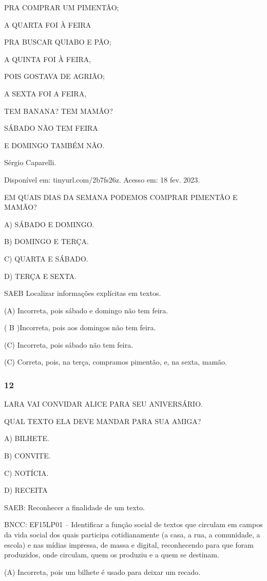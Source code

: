 PRA COMPRAR UM PIMENTÃO;

A QUARTA FOI À FEIRA

PRA BUSCAR QUIABO E PÃO;

A QUINTA FOI À FEIRA,

POIS GOSTAVA DE AGRIÃO;

A SEXTA FOI A FEIRA,

TEM BANANA? TEM MAMÃO?

SÁBADO NÃO TEM FEIRA

E DOMINGO TAMBÉM NÃO.

Sérgio Caparelli.

Disponível
em: tinyurl.com/2b7fs26z. Acesso em: 18 fev. 2023.

EM QUAIS DIAS DA SEMANA PODEMOS COMPRAR PIMENTÃO E MAMÃO?

A) SÁBADO E DOMINGO.

B) DOMINGO E TERÇA.

C) QUARTA E SÁBADO.

D) TERÇA E SEXTA.

SAEB Localizar informações explícitas em textos.

(A) Incorreta, pois sábado e domingo não tem feira.

( B )Incorreta, pois aos domingos não tem feira.

(C) Incorreta, pois sábado não tem feira.

(C) Correta, pois, na terça, compramos pimentão, e, na sexta, mamão.

\subsubsection{12}\label{section-37}

LARA VAI CONVIDAR ALICE PARA SEU ANIVERSÁRIO.

QUAL TEXTO ELA DEVE MANDAR PARA SUA AMIGA?

A) BILHETE.

B) CONVITE.

C) NOTÍCIA.

D) RECEITA

SAEB: Reconhecer a finalidade de um texto.

BNCC: EF15LP01 -- Identificar a função social de textos que
circulam em campos da vida social dos quais participa cotidianamente (a
casa, a rua, a comunidade, a escola) e nas mídias impressa, de massa e
digital, reconhecendo para que foram produzidos, onde circulam, quem os
produziu e a quem se destinam.

(A) Incorreta, pois um bilhete é usado para deixar um recado.

